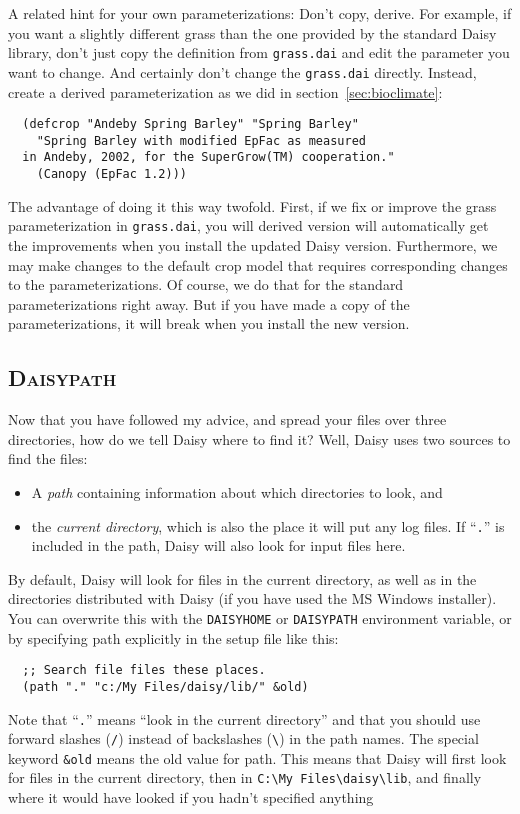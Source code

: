 \documentclass[a4paper]{article}
\begin{document}
A related hint for your own parameterizations: Don't copy, derive.
For example, if you want a slightly different grass than the one
provided by the standard Daisy library, don't just copy the
definition from \texttt{grass.dai} and edit the parameter you want to
change.  And certainly don't change the \texttt{grass.dai} directly.
Instead, create a derived parameterization as we did in
section~\ref{sec:bioclimate}:
\begin{verbatim}
  (defcrop "Andeby Spring Barley" "Spring Barley"
    "Spring Barley with modified EpFac as measured
  in Andeby, 2002, for the SuperGrow(TM) cooperation."
    (Canopy (EpFac 1.2)))
\end{verbatim}
The advantage of doing it this way twofold.  First, if we fix or
improve the grass parameterization in \texttt{grass.dai}, you will
derived version will automatically get the improvements when you
install the updated Daisy version.  Furthermore, we may make
changes to the default crop model that requires corresponding changes
to the parameterizations.  Of course, we do that for the standard
parameterizations right away.  But if you have made a copy of the
parameterizations, it will break when you install the new version.

\subsection{\textsc{Daisypath}}
\label{sec:daisypath}

Now that you have followed my advice, and spread your files over three
directories, how do we tell Daisy where to find it?  Well, Daisy
uses two sources to find the files:
\begin{itemize}
\item A \emph{path} containing information about which directories to
  look, and
\item the \emph{current directory}, which is also the place it will
  put any log files.  If ``\texttt{.}'' is included in the path, Daisy
  will also look for input files here.
\end{itemize}

By default, Daisy will look for files in the current directory, as
well as in the directories distributed with Daisy (if you have used
the MS Windows installer).  You can overwrite this with the
\texttt{DAISYHOME} or \texttt{DAISYPATH} environment variable, or by
specifying path explicitly in the setup file like this:
\begin{verbatim}
  ;; Search file files these places.
  (path "." "c:/My Files/daisy/lib/" &old)
\end{verbatim}
Note that ``\texttt{.}'' means ``look in the current directory'' and
that you should use forward slashes (\verb|/|) instead of backslashes
(\verb|\|) in the path names.  The special keyword \verb|&old| means
the old value for path.  This means that Daisy will first look for
files in the current directory, then in \verb|C:\My Files\daisy\lib|,
and finally where it would have looked if you hadn't specified
anything
\end{document}
